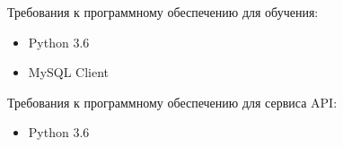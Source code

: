 Требования к программному обеспечению для обучения:
\begin{itemize}
  \item Python 3.6
  \item MySQL Client
\end{itemize}

Требования к программному обеспечению для сервиса API:
\begin{itemize}
  \item Python 3.6
\end{itemize}
